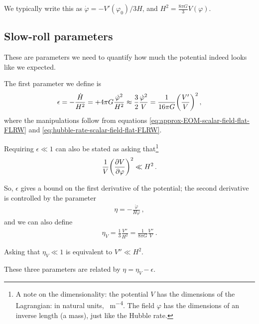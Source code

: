 \documentclass[main.tex]{subfiles}
\begin{document}
We typically write this as \(\dot{\varphi} = - V' (\varphi_0 ) / 3H\), and \(H^2 = \frac{8 \pi G}{3} V(\varphi )\). 

\subsection{Slow-roll parameters}

These are parameters we need to quantify how much the potential indeed looks like we expected. 

The first parameter we define is
%
\begin{align}
\epsilon 
= - \frac{\dot{H}}{H^2} = 
+ 4 \pi G \frac{\dot{\varphi}^2}{H^2} \approx \frac{3}{2} \frac{\dot{\varphi}^2}{V} = \frac{1}{16 \pi G} \qty(\frac{V'}{V})^2
\,,
\end{align}
%
where the manipulations follow from equations \eqref{eq:approx-EOM-scalar-field-flat-FLRW} and \eqref{eq:hubble-rate-scalar-field-flat-FLRW}.

Requiring \(\epsilon \ll 1\) can also be stated as asking that\footnote{A note on the dimensionality: the potential \(V\) has the dimensions of the Lagrangian: in natural units, \SI{}{m^{-4}}. The field \(\varphi \) has the dimensions of an inverse length (a mass), just like the Hubble rate.}
%
\begin{align}
\frac{1}{V} \qty(\pdv{V}{\varphi })^2 \ll H^2
\,.
\end{align}

So, \(\epsilon \) gives a bound on the first derivative of the potential; the second derivative is controlled by the parameter 
%
\begin{align}
\eta = - \frac{\ddot{\varphi}}{H \dot{\varphi}
}
\,,
\end{align}
%
and we can also define 
%
\begin{align}
\eta _V = \frac{1}{3} \frac{V''}{H^2} = \frac{1}{8 \pi G} \frac{V''}{V}
\,.
\end{align}

Asking that \(\eta _V \ll 1 \) is equivalent to \(V'' \ll H^2\). 

These three parameters are related by \(\eta = \eta _V - \epsilon \).
\end{document}
